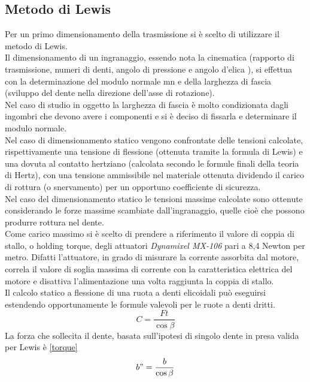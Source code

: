 \documentclass[%
corpo=11pt,
twoside,
 stile=classica,
oldstyle,
greek,%
]{toptesi}
\begin{document}
	\subsection{Metodo di Lewis}
	Per un primo dimensionamento della trasmissione si è scelto di utilizzare il metodo di Lewis. \\
	Il dimensionamento di un ingranaggio, essendo nota la cinematica (rapporto di trasmissione, numeri di denti, angolo di pressione 
	 e angolo d’elica ), si effettua con la determinazione del modulo normale mn e della larghezza di fascia (sviluppo del dente nella
	direzione dell’asse di rotazione).\\
	 Nel caso di studio in oggetto la larghezza di fascia è molto condizionata dagli ingombri che devono avere i componenti e si è deciso di fissarla e determinare il modulo normale. \\
	Nel caso di dimensionamento statico vengono confrontate delle tensioni calcolate, rispettivamente una tensione di flessione (ottenuta tramite la formula di Lewis) e una dovuta al contatto hertziano (calcolata secondo le formule finali della teoria di Hertz), con una tensione ammissibile nel materiale ottenuta dividendo il carico di rottura (o snervamento) per un opportuno coefficiente di sicurezza. \\
	Nel caso del dimensionamento statico le tensioni massime calcolate sono ottenute considerando le forze massime scambiate dall’ingranaggio, quelle cioè che possono produrre rottura nel dente.\\
	Come carico massimo si è scelto di prendere a riferimento il valore di coppia di stallo, o holding torque, degli attuatori \textit{Dynamixel MX-106} pari a 8,4 Newton per metro. Difatti l'attuatore, in grado di misurare la corrente assorbita dal motore, correla il valore di soglia massima di corrente con la caratteristica elettrica del motore e disattiva l'alimentazione una volta raggiunta la coppia di stallo. \\
	Il calcolo statico a flessione di una ruota a denti elicoidali può eseguirsi estendendo opportunamente le formule valevoli per le ruote a denti dritti.
	\begin{equation}\label{torque}
	C=\frac{Ft}{\cos\beta}
	\end{equation}
	La forza che sollecita il dente, basata sull'ipotesi di singolo dente in presa valida per Lewis è \ref{torque}
	\begin{equation}\label{larghezza}
	b"=\frac{b}{\cos\beta}
	\end{equation}	
\end{document}
